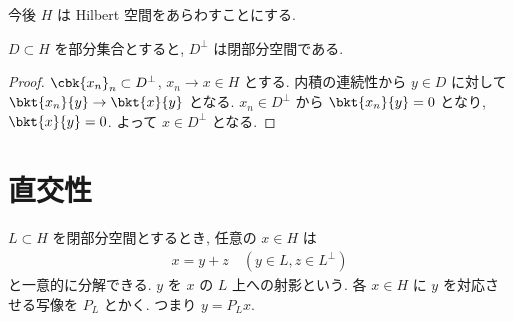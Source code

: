 \documentclass[openany, a4paper, oneside]{jsbook}
\begin{document}
今後 $H$ は Hilbert 空間をあらわすことにする.
\begin{lem}\label{functional_analysis_hilbert_space_yukimi_5}
 $D \subset H$ を部分集合とすると, $D^{\perp}$ は閉部分空間である.
\end{lem}
\begin{proof}
$\cbk{x_n}_n \subset D^{\perp}$, $x_n \to x \in H$ とする.
内積の連続性から $y \in D$ に対して $\bkt{x_n}{y} \to \bkt{x}{y}$ となる.
$x_{n} \in D^{\perp}$ から $\bkt{x_n}{y} = 0$ となり, $\bkt{x}{y} = 0$.
よって $x \in D^{\perp}$ となる.
\end{proof}
\section{直交性}

\begin{thm}[射影定理]
 $L \subset H$ を閉部分空間とするとき, 任意の $x \in H$ は
 \begin{align}
  x
  =
  y + z \quad (y \in L, z \in L^{\perp})
 \end{align}
 と一意的に分解できる.
 $y$ を $x$ の $L$ 上への射影という.
 各 $x \in H$ に $y$ を対応させる写像を $P_{L}$ とかく.
 つまり $y = P_{L}x$.
\end{thm}
\end{document}
